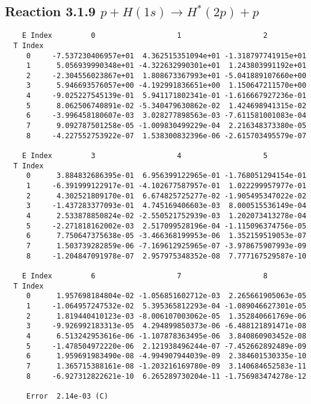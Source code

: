 \documentclass[12pt]{article}
\begin{document}
\newpage
\subsection{
Reaction 3.1.9 $   p + H(1s) \rightarrow H^*(2p) + p$}


\begin{small}\begin{verbatim}
    E Index         0                   1                   2
  T Index
     0     -7.537230406957e+01  4.362515351094e+01 -1.318797741915e+01
     1      5.056939990348e+01 -4.322632990301e+01  1.243803991192e+01
     2     -2.304556023867e+01  1.808673367993e+01 -5.041889107660e+00
     3      5.946693576057e+00 -4.192991836651e+00  1.150647211570e+00
     4     -9.025227545139e-01  5.941171802341e-01 -1.616667927236e-01
     5      8.062506740891e-02 -5.340479630862e-02  1.424698941315e-02
     6     -3.996458180607e-03  3.028277898563e-03 -7.611581001083e-04
     7      9.092787501258e-05 -1.009830499229e-04  2.216348373380e-05
     8     -4.227552753922e-07  1.538300832396e-06 -2.615703495579e-07

    E Index         3                   4                   5
  T Index
     0      3.884832686395e-01  6.956399122965e-01 -1.768051294154e-01
     1     -6.391999122917e-01 -4.102677587957e-01  1.022299957977e-01
     2      4.302521809170e-01  6.674825725277e-02 -1.905495347022e-02
     3     -1.437283377093e-01  4.745169406603e-03  8.000515536149e-04
     4      2.533878850824e-02 -2.550521752939e-03  1.202073413278e-04
     5     -2.271818162002e-03  2.517099528196e-04 -1.115096374756e-05
     6      7.750647375638e-05 -3.466368199953e-06  1.352159519053e-07
     7      1.503739282859e-06 -7.169612925965e-07 -3.978675907993e-09
     8     -1.204847091978e-07  2.957975348352e-08  7.777167529587e-10

    E Index         6                   7                   8
  T Index
     0      1.957698184804e-02 -1.056851602712e-03  2.265661905063e-05
     1     -1.064957247532e-02  5.395365812293e-04 -1.089046627301e-05
     2      1.819440410123e-03 -8.006107003062e-05  1.352840661769e-06
     3     -9.926992183313e-05  4.294899850373e-06 -6.488121891471e-08
     4      6.513242953616e-06 -1.107878363495e-06  3.840860903452e-08
     5     -1.478504972220e-06  2.121938496244e-07 -7.452662892489e-09
     6      1.959691983490e-08 -4.994907944039e-09  2.384601530335e-10
     7      1.365715388161e-08 -1.203216169780e-09  3.140684652583e-11
     8     -6.927312822621e-10  6.265289730204e-11 -1.756983474278e-12

     Error  2.14e-03 (C)
\end{verbatim}\end{small}
\end{document}
